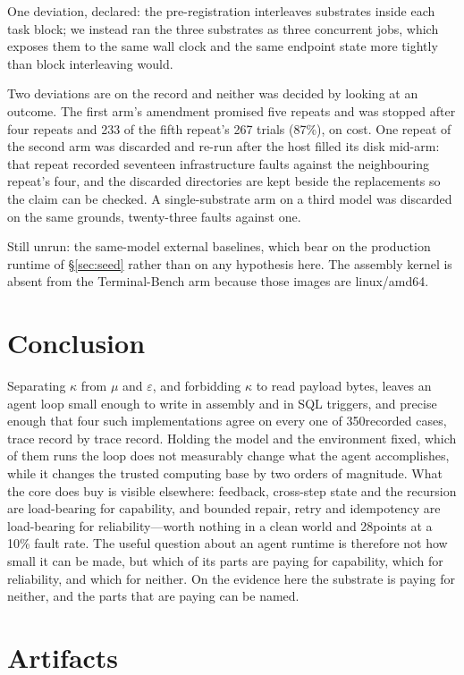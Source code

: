 \documentclass[11pt,a4paper]{article}
\begin{document}
One deviation, declared: the pre-registration interleaves substrates inside
each task block; we instead ran the three substrates as three concurrent jobs,
which exposes them to the same wall clock and the same endpoint state more
tightly than block interleaving would.

Two deviations are on the record and neither was decided by looking at an
outcome. The first arm's amendment promised five repeats and was stopped after
four repeats and 233 of the fifth repeat's 267 trials (87\%), on cost. One repeat of the second arm was discarded
and re-run after the host filled its disk mid-arm: that repeat recorded
seventeen infrastructure faults against the neighbouring repeat's four, and the
discarded directories are kept beside the replacements so the claim can be
checked. A single-substrate arm on a third model was discarded on the same
grounds, twenty-three faults against one.

Still unrun: the same-model external baselines, which bear on the production
runtime of \S\ref{sec:seed} rather than on any hypothesis here. The assembly
kernel is absent from the Terminal-Bench arm because those images are
linux/amd64.

\section{Conclusion}

Separating $\kappa$ from $\mu$ and $\varepsilon$, and forbidding $\kappa$ to
read payload bytes, leaves an agent loop small enough to write in assembly and
in SQL triggers, and precise enough that four such implementations agree on
every one of 350recorded cases, trace record by trace record. Holding
the model and the environment fixed, which of them runs the loop does not
measurably change what the agent accomplishes, while it changes the trusted
computing base by two orders of magnitude. What the core does buy is visible
elsewhere: feedback, cross-step state and the recursion are load-bearing for
capability, and bounded repair, retry and idempotency are load-bearing for
reliability---worth nothing in a clean world and 28points at a
10\% fault rate. The useful question about an agent runtime is therefore not how small it can be
made, but which of its parts are paying for capability, which for reliability,
and which for neither. On the evidence here the substrate is paying for
neither, and the parts that are paying can be named.

\section*{Artifacts}
\end{document}
